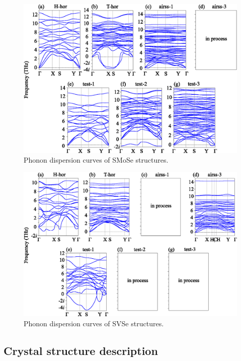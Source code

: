 \documentclass[a4paperm]{article}
\begin{document}
\begin{figure}[H]
	\includegraphics[width=\textwidth]{phon_smose.eps}
	\caption{Phonon dispersion curves of SMoSe structures. }
	\label{phon_smose}
\end{figure}

\begin{figure}[H]
	\includegraphics[width=\textwidth]{phon_svse.eps}
	\caption{Phonon dispersion curves of SVSe structures. }
	\label{phon_svse}
\end{figure}



\subsection{Crystal structure description}
\end{document}

